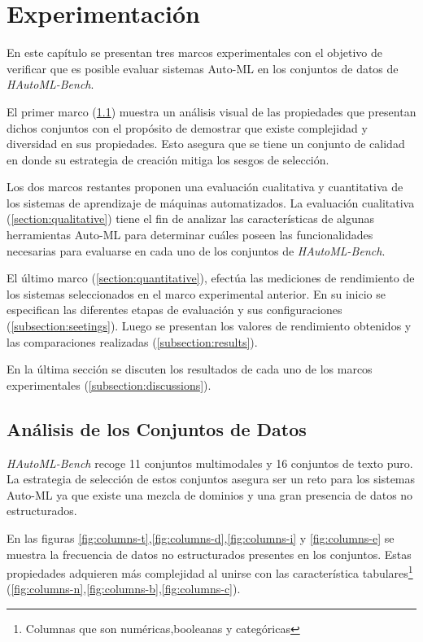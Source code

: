 \chapter{Experimentación}\label{chapter:experiments}

En este capítulo se presentan tres marcos experimentales con el objetivo de verificar que es posible evaluar sistemas Auto-ML en los conjuntos de datos de 
\textit{HAutoML-Bench}. 

El primer marco (\ref{section:data}) muestra un análisis visual de las propiedades que presentan dichos conjuntos con el propósito de demostrar que existe complejidad y 
diversidad en sus propiedades. Esto asegura que se tiene un conjunto de calidad en donde su estrategia de creación mitiga los sesgos de 
selección.

Los dos marcos restantes proponen una evaluación cualitativa y cuantitativa de los sistemas de aprendizaje de máquinas automatizados.
La evaluación cualitativa (\ref{section:qualitative}) tiene el fin de analizar las características de algunas herramientas Auto-ML para determinar cuáles 
poseen las funcionalidades necesarias para evaluarse en cada uno de los conjuntos de \textit{HAutoML-Bench}.

El último marco (\ref{section:quantitative}), efectúa las mediciones de rendimiento de los sistemas seleccionados en el marco experimental anterior. En su inicio 
se especifican las diferentes etapas de evaluación y sus configuraciones (\ref{subsection:seetings}). Luego se presentan los valores de 
rendimiento obtenidos y las comparaciones realizadas (\ref{subsection:results}).

En la última sección se discuten los resultados de cada uno de los marcos experimentales (\ref{subsection:discussions}).  

\section{Análisis de los Conjuntos de Datos}\label{section:data}

\textit{HAutoML-Bench} recoge 11 conjuntos multimodales y 16 conjuntos de texto puro.
La estrategia de selección de estos conjuntos asegura ser un reto para los sistemas Auto-ML ya que existe una mezcla de dominios y una gran presencia de datos no 
estructurados.

En las figuras \ref{fig:columns-t},\ref{fig:columns-d},\ref{fig:columns-i} y \ref{fig:columns-e} se muestra la frecuencia de datos no estructurados presentes en 
los conjuntos. 
Estas propiedades adquieren más complejidad al unirse con las característica tabulares\footnote{Columnas que son numéricas,booleanas y categóricas} 
(\ref{fig:columns-n},\ref{fig:columns-b},\ref{fig:columns-c}).

